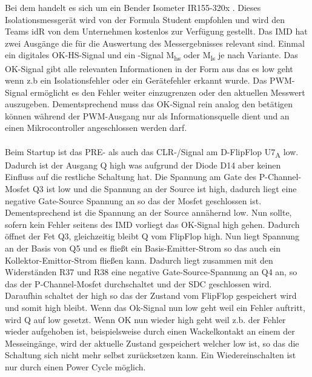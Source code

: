 Bei dem  handelt es sich um ein Bender Isometer IR155-320x \cite{ISOMETERIR155-3203/IR155-3204}. Dieses Isolationsmessgerät wird von der Formula Student empfohlen und wird den Teams \ac{idR} von dem Unternehmen kostenlos zur Verfügung gestellt.
Das \ac{IMD} hat zwei Ausgänge die für die Auswertung des Messergebnisses relevant sind. Einmal ein digitales OK-HS-Signal und ein -Signal M\textsubscript{hs} oder M\textsubscript{ls} je nach Variante. Das OK-Signal gibt alle relevanten Informationen in der Form aus das es low geht wenn z.b ein Isolationsfehler oder ein Gerätefehler erkannt wurde. Das \ac{PWM}-Signal ermöglicht es den Fehler weiter einzugrenzen oder den aktuellen Messwert auszugeben. Dementsprechend muss das OK-Signal rein analog den  betätigen können während der \ac{PWM}-Ausgang nur als Informationsquelle dient und an einen Mikrocontroller angeschlossen werden darf.
\\
\\
Beim Startup ist das PRE- als auch das CLR-/Signal am D-FlipFlop U7\textsubscript{A} low. Dadurch ist der Ausgang Q high was aufgrund der Diode D14 aber keinen Einfluss auf die restliche Schaltung hat. Die Spannung am Gate des P-Channel-Mosfet Q3 ist low und die Spannung an der Source ist high, dadurch liegt eine negative Gate-Source Spannung an so das der Mosfet geschlossen ist. Dementsprechend ist die Spannung an der Source annähernd low. Nun sollte, sofern kein Fehler seitens des \ac{IMD} vorliegt das OK-Signal high gehen. Dadurch öffnet der Fet Q3, gleichzeitig bleibt Q vom FlipFlop high. Nun liegt Spannung an der Basis von Q5 und es fließt ein Basis-Emitter-Strom so das auch ein Kollektor-Emittor-Strom fließen kann. Dadurch liegt zusammen mit den Widerständen R37 und R38 eine negative Gate-Source-Spannung an Q4 an, so das der P-Channel-Mosfet durchschaltet und der \ac{SDC} geschlossen wird. Daraufhin schaltet der  high so das der Zustand vom FlipFlop gespeichert wird und somit high bleibt. Wenn das Ok-Signal nun low geht weil ein Fehler auftritt, wird Q auf low gesetzt. Wenn OK nun wieder high geht weil z.b. der Fehler wieder aufgehoben ist, beispielsweise durch einen Wackelkontakt an einem der Messeingänge, wird der aktuelle Zustand gespeichert welcher low ist, so das die Schaltung sich nicht mehr selbst zurücksetzen kann. Ein Wiedereinschalten ist nur durch einen Power Cycle möglich.

